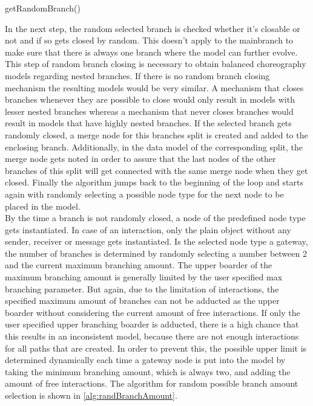 \begin{algorithm}[H]
\DontPrintSemicolon
\SetAlgoLined
{}
\caption{getRandomBranch()}
\label{alg:randBranch}
\end{algorithm}

In the next step, the random selected branch is checked whether it's closable or not and if so gets closed by random. This doesn't apply to the mainbranch to make sure that there is always one branch where the model can further evolve. This step of random branch closing is necessary to obtain balanced choreography models regarding nested branches. If there is no random branch closing mechanism the resulting models would be very similar. A mechanism that closes branches whenever they are possible to close would only result in models with lesser nested branches whereas a mechanism that never closes branches would result in models that have highly nested branches. If the selected branch gets randomly closed, a merge node for this branches split is created and added to the enclosing branch. Additionally, in the data model of the corresponding split, the merge node gets noted in order to assure that the last nodes of the other branches of this split will get connected with the same merge node when they get closed. Finally the algorithm jumps back to the beginning of the loop and starts again with randomly selecting a possible node type for the next node to be placed in the model.\\
By the time a branch is not randomly closed, a node of the predefined node type gets instantiated. In case of an interaction, only the plain object without any sender, receiver or message gets instantiated. Is the selected node type a gateway, the number of branches is determined by randomly selecting a number between 2 and the current maximum branching amount. The upper boarder of the maximum branching amount is generally limited by the user specified max branching parameter. But again, due to the limitation of interactions, the specified maximum amount of branches can not be adducted as the upper boarder without considering the current amount of free interactions. If only the user specified upper branching boarder is adducted, there is a high chance that this results in an inconsistent model, because there are not enough interactions for all paths that are created. In order to prevent this, the possible upper limit is determined dynamically each time a gateway node is put into the model by taking the minimum branching amount, which is always two, and adding the amount of free interactions. The algorithm for random possible branch amount selection is shown in \ref{alg:randBranchAmount}.\\

